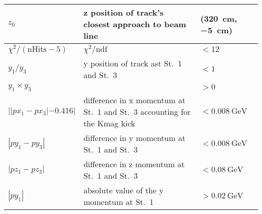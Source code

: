 \documentclass[../main.tex]{subfiles}
\begin{document}
\begin{table}[ht!]
\begin{tabular}{|m{4.5cm}|m{7cm}|m{3cm}|}
		\\ \hline
		$z_0$                                                                                                                                & z position of track's closest approach to beam   line                                & (\SI{320}{\cm},\SI{-5}{\cm}) \\ \hline
		$\chi^2/(\textrm{nHits}-5)$                                                                                                          & $\chi^2/\textrm{ndf}$                                                                & $<12$                        \\ \hline
		$y_1/y_3$                                                                                                                            & y position of track ast St.\ 1   and St.\ 3                                          & $<1$                         \\ \hline
		$y_1\times y_3$                                                                                                                      &                                                                                      & $>0$                         \\ \hline
		$| |px_1 - px_3| -0.416|$                                                                                                            & difference in x momentum at St.\   1 and St.\ 3 accounting for the Kmag kick         & $<\SI{0.008}{\GeV}$          \\ \hline
		$|py_1 - py_3|$                                                                                                                      & difference in y momentum at St.\   1 and St.\ 3                                      & $<\SI{0.008}{\GeV}$          \\ \hline
		$|pz_1 - pz_3|$                                                                                                                      & difference in z momentum at St.\   1 and St.\ 3                                      & $<\SI{0.08}{\GeV}$           \\ \hline
		$|py_1 |$                                                                                                                            & absolute value of the y momentum   at St.\ 1                                         & $>\SI{0.02}{\GeV}$           \\ \hline
	\end{tabular}
\end{table}
\end{document}

